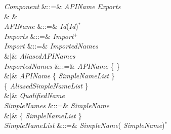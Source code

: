 \begin{Grammar}
\emph{Component} &::=&
 \emph{APIName}  \emph{Exports}
 \\
& &\\

\emph{APIName} &::=& \emph{Id}(\emph{Id})$^*$\\

\emph{Imports} &::=& \emph{Import}$^+$\\
\emph{Import}
&::=&  \emph{ImportedNames} \\
&$|$&   \emph{AliasedAPINames} \\

\emph{ImportedNames}
&::=& \emph{APIName}  \{  \}
\\
&$|$& \emph{APIName} 
\{ \emph{SimpleNameList}  \}\\
\{ \emph{AliasedSimpleNameList}  \}\\
&$|$& \emph{QualifiedName} \\

\emph{SimpleNames} &::=& \emph{SimpleName} \\
&$|$& \{ \emph{SimpleNameList} \}\\

\emph{SimpleNameList} &::=& \emph{SimpleName}(\EXP{,} \emph{SimpleName})$^*$ \\

\end{Grammar}

